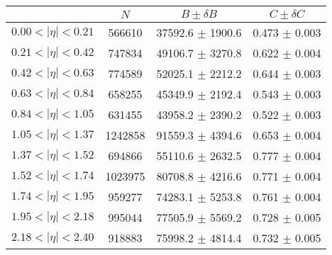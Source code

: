\begin{tabular}{lccc}
\hline
    &   $N$   & $B \pm \delta B$  &  $C \pm \delta C$ \\
\hline
$0.00 < |\eta| <0.21$          & 566610     & 37592.6    $\pm$ 1900.6 & 0.473      $\pm$ 0.003 \\
$0.21 < |\eta| <0.42$          & 747834     & 49106.7    $\pm$ 3270.8 & 0.622      $\pm$ 0.004 \\
$0.42 < |\eta| <0.63$          & 774589     & 52025.1    $\pm$ 2212.2 & 0.644      $\pm$ 0.003 \\
$0.63 < |\eta| <0.84$          & 658255     & 45349.9    $\pm$ 2192.4 & 0.543      $\pm$ 0.003 \\
$0.84 < |\eta| <1.05$          & 631455     & 43958.2    $\pm$ 2390.2 & 0.522      $\pm$ 0.003 \\
$1.05 < |\eta| <1.37$          & 1242858    & 91559.3    $\pm$ 4394.6 & 0.653      $\pm$ 0.004 \\
$1.37 < |\eta| <1.52$          & 694866     & 55110.6    $\pm$ 2632.5 & 0.777      $\pm$ 0.004 \\
$1.52 < |\eta| <1.74$          & 1023975    & 80708.8    $\pm$ 4216.6 & 0.771      $\pm$ 0.004 \\
$1.74 < |\eta| <1.95$          & 959277     & 74283.1    $\pm$ 5253.8 & 0.761      $\pm$ 0.004 \\
$1.95 < |\eta| <2.18$          & 995044     & 77505.9    $\pm$ 5569.2 & 0.728      $\pm$ 0.005 \\
$2.18 < |\eta| <2.40$          & 918883     & 75998.2    $\pm$ 4814.4 & 0.732      $\pm$ 0.005 \\
\hline
\end{tabular}

